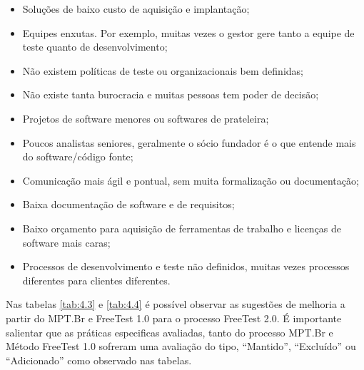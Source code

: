 \begin{itemize}
    \item Soluções de baixo custo de aquisição e implantação;
    \item Equipes enxutas. Por exemplo, muitas vezes o gestor gere tanto a equipe de teste quanto de desenvolvimento;
    \item Não existem políticas de teste ou organizacionais bem definidas;
    \item Não existe tanta burocracia e muitas pessoas tem poder de decisão;
    \item Projetos de software menores ou softwares de prateleira;
    \item Poucos analistas seniores, geralmente o sócio fundador é o que entende mais do software/código fonte;
    \item Comunicação mais ágil e pontual, sem muita formalização ou documentação;
    \item Baixa documentação de software e de requisitos;
    \item Baixo orçamento para aquisição de ferramentas de trabalho e licenças de software mais caras;
    \item Processos de desenvolvimento e teste não definidos, muitas vezes processos diferentes para clientes diferentes.
\end{itemize}

Nas tabelas \ref{tab:4.3} e \ref{tab:4.4} é possível observar as sugestões de melhoria a partir do MPT.Br e FreeTest 1.0 para o processo FreeTest 2.0. É importante salientar que as práticas especificas avaliadas, tanto do processo MPT.Br e Método FreeTest 1.0 sofreram uma avaliação do tipo, “Mantido”, “Excluído” ou “Adicionado” como observado nas tabelas. 

